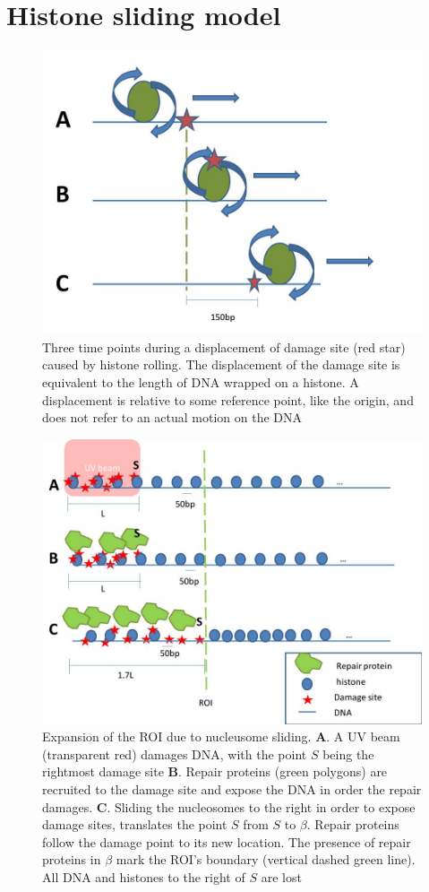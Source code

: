 \documentclass[12pt]{report}
\begin{document}
		\section{Histone sliding model}\label{section:HistoneSlidingModel}
		   \begin{figure}[H]
		   	\centering
		   	\includegraphics[width=0.7\linewidth]{Images/SlidingModel/histoneSlidingSingle}
		   	\caption{{Three time points during a displacement of damage site (red star) caused by histone rolling. The displacement of the damage site is equivalent to the length of DNA wrapped on a histone. A displacement is relative to some reference point, like the origin, and does not refer to an actual motion on the DNA}}
		   	\label{fig:histoneSlidingSingle}
		   \end{figure}
		   
		   \begin{figure}[H]
		   	\centering
		   	\includegraphics[width=0.7\linewidth]{Images/SlidingModel/histoneSlidingMulti}
		   	\caption{Expansion of the ROI due to nucleusome sliding. \textbf{A}. A UV beam (transparent red) damages DNA, with the point $S$ being the rightmost damage site \textbf{B}. Repair proteins (green polygons) are recruited to the damage site and expose the DNA in order the repair damages. \textbf{C}. Sliding the nucleosomes to the right in order to expose damage sites, translates the point $S$ from $S$ to $\beta$. Repair proteins follow the damage point to its new location. The presence of repair proteins in $\beta$ mark the ROI's boundary (vertical dashed green line). All DNA and histones to the right of $S$ are lost}
		   	\label{fig:histoneSlidingMulti}
		   \end{figure}
		   
\end{document}
